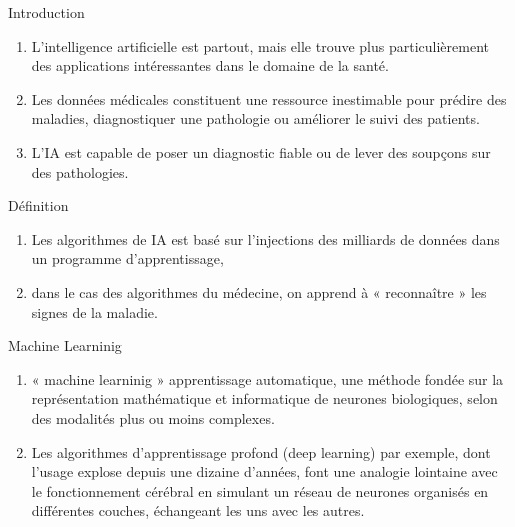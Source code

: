 {\placelogotrue
\begin{frame}{Introduction}
    \begin{enumerate}[<+-|alert@+>][$\blacksquare$]
        \item
        L'intelligence artificielle est partout, mais elle trouve plus particulièrement
        des applications intéressantes dans le domaine de la santé.

        \item
        Les données médicales constituent une ressource inestimable pour prédire des maladies,
        diagnostiquer une pathologie ou améliorer le suivi des patients.

        \item
        L'IA est capable de poser un diagnostic fiable ou de lever des soupçons sur des
        pathologies.
    \end{enumerate}
\end{frame}




\begin{frame}{Définition}
    \begin{enumerate}[<+-|alert@+>][$\blacksquare$]
        \item
        Les algorithmes de IA est basé sur  l'injections des milliards de données
        dans un programme d'apprentissage,

        \item
        dans le cas des algorithmes du médecine, on apprend à « reconnaître » les signes
        de la maladie.
    \end{enumerate}
\end{frame}

\begin{frame}{Machine Learninig}
    \begin{enumerate}[<+-|alert@+>][$\blacksquare$]
        \item
        « machine learninig » apprentissage automatique, une méthode fondée sur
        la représentation mathématique et informatique de neurones
        biologiques, selon des modalités plus ou moins complexes.

        \item
        Les algorithmes d'apprentissage profond (deep learning) par exemple, dont
        l'usage explose depuis une dizaine d'années, font une analogie
        lointaine avec le fonctionnement cérébral en simulant un réseau de
        neurones organisés en différentes couches, échangeant les uns avec les
        autres.


\end{enumerate}
\end{frame}}
